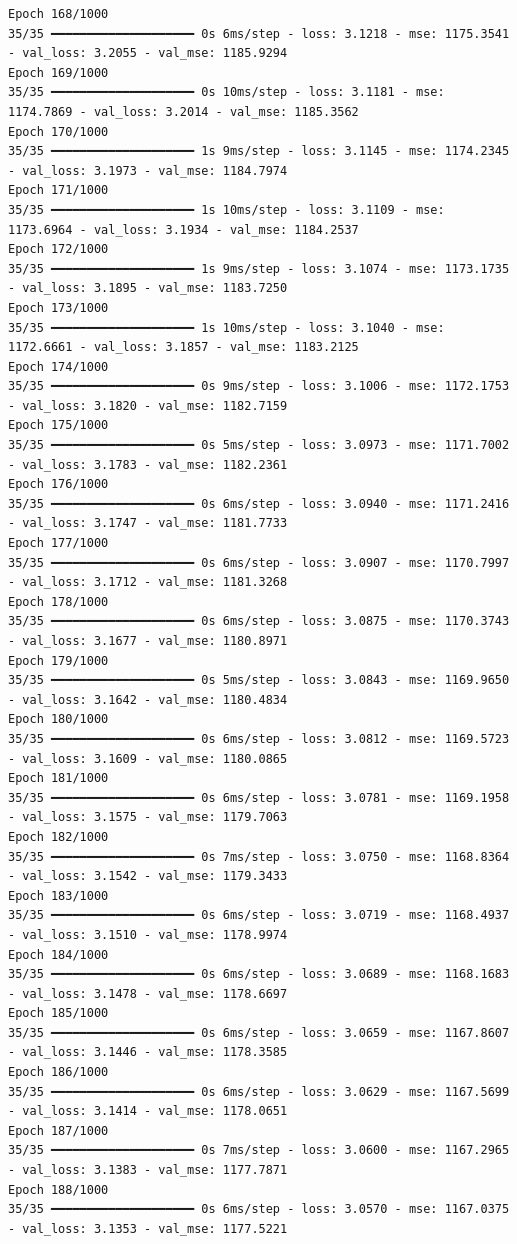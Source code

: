 \documentclass[
  letterpaper,
  DIV=11,
  numbers=noendperiod]{scrreprt}
\begin{document}
\begin{verbatim}
Epoch 168/1000
35/35 ━━━━━━━━━━━━━━━━━━━━ 0s 6ms/step - loss: 3.1218 - mse: 1175.3541 - val_loss: 3.2055 - val_mse: 1185.9294
Epoch 169/1000
35/35 ━━━━━━━━━━━━━━━━━━━━ 0s 10ms/step - loss: 3.1181 - mse: 1174.7869 - val_loss: 3.2014 - val_mse: 1185.3562
Epoch 170/1000
35/35 ━━━━━━━━━━━━━━━━━━━━ 1s 9ms/step - loss: 3.1145 - mse: 1174.2345 - val_loss: 3.1973 - val_mse: 1184.7974
Epoch 171/1000
35/35 ━━━━━━━━━━━━━━━━━━━━ 1s 10ms/step - loss: 3.1109 - mse: 1173.6964 - val_loss: 3.1934 - val_mse: 1184.2537
Epoch 172/1000
35/35 ━━━━━━━━━━━━━━━━━━━━ 1s 9ms/step - loss: 3.1074 - mse: 1173.1735 - val_loss: 3.1895 - val_mse: 1183.7250
Epoch 173/1000
35/35 ━━━━━━━━━━━━━━━━━━━━ 1s 10ms/step - loss: 3.1040 - mse: 1172.6661 - val_loss: 3.1857 - val_mse: 1183.2125
Epoch 174/1000
35/35 ━━━━━━━━━━━━━━━━━━━━ 0s 9ms/step - loss: 3.1006 - mse: 1172.1753 - val_loss: 3.1820 - val_mse: 1182.7159
Epoch 175/1000
35/35 ━━━━━━━━━━━━━━━━━━━━ 0s 5ms/step - loss: 3.0973 - mse: 1171.7002 - val_loss: 3.1783 - val_mse: 1182.2361
Epoch 176/1000
35/35 ━━━━━━━━━━━━━━━━━━━━ 0s 6ms/step - loss: 3.0940 - mse: 1171.2416 - val_loss: 3.1747 - val_mse: 1181.7733
Epoch 177/1000
35/35 ━━━━━━━━━━━━━━━━━━━━ 0s 6ms/step - loss: 3.0907 - mse: 1170.7997 - val_loss: 3.1712 - val_mse: 1181.3268
Epoch 178/1000
35/35 ━━━━━━━━━━━━━━━━━━━━ 0s 6ms/step - loss: 3.0875 - mse: 1170.3743 - val_loss: 3.1677 - val_mse: 1180.8971
Epoch 179/1000
35/35 ━━━━━━━━━━━━━━━━━━━━ 0s 5ms/step - loss: 3.0843 - mse: 1169.9650 - val_loss: 3.1642 - val_mse: 1180.4834
Epoch 180/1000
35/35 ━━━━━━━━━━━━━━━━━━━━ 0s 6ms/step - loss: 3.0812 - mse: 1169.5723 - val_loss: 3.1609 - val_mse: 1180.0865
Epoch 181/1000
35/35 ━━━━━━━━━━━━━━━━━━━━ 0s 6ms/step - loss: 3.0781 - mse: 1169.1958 - val_loss: 3.1575 - val_mse: 1179.7063
Epoch 182/1000
35/35 ━━━━━━━━━━━━━━━━━━━━ 0s 7ms/step - loss: 3.0750 - mse: 1168.8364 - val_loss: 3.1542 - val_mse: 1179.3433
Epoch 183/1000
35/35 ━━━━━━━━━━━━━━━━━━━━ 0s 6ms/step - loss: 3.0719 - mse: 1168.4937 - val_loss: 3.1510 - val_mse: 1178.9974
Epoch 184/1000
35/35 ━━━━━━━━━━━━━━━━━━━━ 0s 6ms/step - loss: 3.0689 - mse: 1168.1683 - val_loss: 3.1478 - val_mse: 1178.6697
Epoch 185/1000
35/35 ━━━━━━━━━━━━━━━━━━━━ 0s 6ms/step - loss: 3.0659 - mse: 1167.8607 - val_loss: 3.1446 - val_mse: 1178.3585
Epoch 186/1000
35/35 ━━━━━━━━━━━━━━━━━━━━ 0s 6ms/step - loss: 3.0629 - mse: 1167.5699 - val_loss: 3.1414 - val_mse: 1178.0651
Epoch 187/1000
35/35 ━━━━━━━━━━━━━━━━━━━━ 0s 7ms/step - loss: 3.0600 - mse: 1167.2965 - val_loss: 3.1383 - val_mse: 1177.7871
Epoch 188/1000
35/35 ━━━━━━━━━━━━━━━━━━━━ 0s 6ms/step - loss: 3.0570 - mse: 1167.0375 - val_loss: 3.1353 - val_mse: 1177.5221

\end{verbatim}
\end{document}
